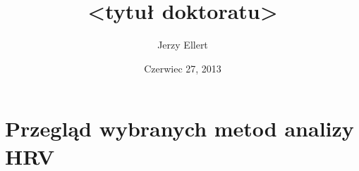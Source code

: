 \documentclass[draft]{report}   %
\begin{document}


\title{<tytuł doktoratu>}
\author{Jerzy Ellert}
\date{Czerwiec 27, 2013}
\maketitle





\chapter{Przegląd wybranych metod analizy HRV}








\end{document}
